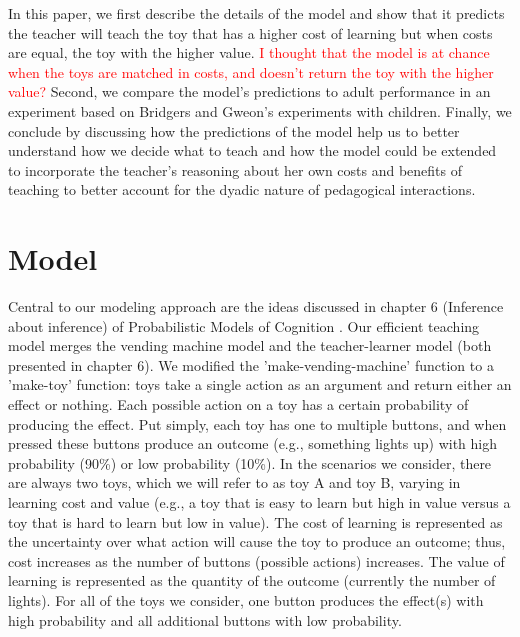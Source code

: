 \documentclass[10pt,letterpaper]{article}
\begin{document}
In this paper, we first describe the details of the model and show that it predicts the teacher will teach the toy that has a higher cost of learning but when costs are equal, the toy with the higher value. \textcolor{red}{I thought that the model is at chance when the toys are matched in costs, and doesn't return the toy with the higher value?} Second, we compare the model's predictions to adult performance in an experiment based on Bridgers and Gweon's experiments with children. Finally, we conclude by discussing how the predictions of the model help us to better understand how we decide what to teach and how the model could be extended to incorporate the teacher's reasoning about her own costs and benefits of teaching to better account for the dyadic nature of pedagogical interactions.

\section{Model}

Central to our modeling approach are the ideas discussed in chapter 6 (Inference about inference) of Probabilistic Models of Cognition \cite{Goodman}. Our efficient teaching model merges the vending machine model and the teacher-learner model (both presented in chapter 6).  We modified the 'make-vending-machine' function to a 'make-toy' function: toys take a single action as an argument and return either an effect or nothing. Each possible action on a toy has a certain probability of producing the effect. Put simply, each toy has one to multiple buttons, and when pressed these buttons produce an outcome (e.g., something lights up) with high probability (90\%) or low probability (10\%). In the scenarios we consider, there are always two toys, which we will refer to as toy A and toy B, varying in learning cost and value (e.g., a toy that is easy to learn but high in value versus a toy that is hard to learn but low in value). The cost of learning is represented as the uncertainty over what action will cause the toy to produce an outcome; thus, cost increases as the number of buttons (possible actions) increases. The value of learning is represented as the quantity of the outcome (currently the number of lights). For all of the toys we consider, one button produces the effect(s) with high probability and all additional buttons with low probability.
\end{document}
